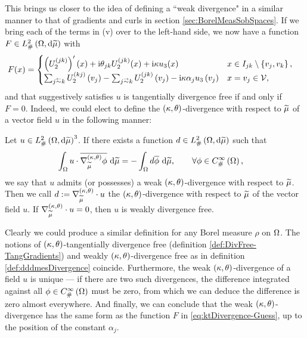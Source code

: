 This brings us closer to the idea of defining a ``weak divergence" in a similar manner to that of gradients and curls in section \ref{sec:BorelMeasSobSpaces}.
If we bring each of the terms in (v) over to the left-hand side, we now have a function $F\in L^2_{\#}\left( \Omega,\mathrm{d} \widetilde{\mu} \right)$ with
\begin{align} \label{eq:ktDivergence-Guess}
	F(x) &= 
	\begin{cases} 
		\bracs{U_2^{(jk)}}'(x) + \rmi\qm_{jk}U_2^{(jk)}(x) + \rmi\wavenumber u_3(x) &
		x\in I_{jk}\setminus\clbracs{v_j,v_k}, \\
		\sum_{j\conRight k}U_2^{(kj)}\bracs{v_j} - \sum_{j\conLeft k}U_2^{(jk)}\bracs{v_j} -\rmi\wavenumber\alpha_j u_3\bracs{v_j} &
		x=v_j\in\vertSet,
	\end{cases}
\end{align}
and that suggestively satisfies $u$ is tangentially divergence free if and only if $F=0$.
Indeed, we could elect to define the $\left( \kappa, \theta \right)$-divergence with respect to $\widetilde{\mu}$ of a vector field $u$ in the following manner:
\begin{definition} \label{def:dddmesDivergence}
	Let $u\in L^2_{\#}\left( \Omega,\mathrm{d} \widetilde{\mu} \right)^3$.
	If there exists a function $d\in L^2_{\#}\left( \Omega,\mathrm{d} \widetilde{\mu} \right)$ such that
	\begin{align*}
		\int_{\Omega} u\cdot\overline{\nabla^{\left( \kappa, \theta \right)}_{\widetilde{\mu}}\phi}  \ \mathrm{d}\widetilde{\mu}
		&= -\int_{\Omega} d\overline{\phi}  \ \mathrm{d}\widetilde{\mu}, \qquad\forall\phi\in C^{\infty}_{\#}\left( \Omega \right),
	\end{align*}
	we say that $u$ admits (or possesses) a weak $\left( \kappa, \theta \right)$-divergence with respect to $\widetilde{\mu}$.
	Then we call $d:=\nabla^{\left( \kappa, \theta \right)}_{\widetilde{\mu}}\cdot u$ the $\left( \kappa, \theta \right)$-divergence with respect to $\widetilde{\mu}$ of the vector field $u$.
	If $\nabla^{\left( \kappa, \theta \right)}_{\widetilde{\mu}}\cdot u=0$, then $u$ is weakly divergence free.
\end{definition}
Clearly we could produce a similar definition for any Borel measure $\rho$ on $\Omega$.
The notions of $\left( \kappa, \theta \right)$-tangentially divergence free (definition \ref{def:DivFree-TangGradients}) and weakly $\left( \kappa, \theta \right)$-divergence free as in definition \ref{def:dddmesDivergence} coincide.
Furthermore, the weak $\left( \kappa, \theta \right)$-divergence of a field $u$ is unique --- if there are two such divergences, the difference integrated against all $\phi\in C^{\infty}_{\#}\left( \Omega \right)$ must be zero, from which we can deduce the difference is zero almost everywhere.
And finally, we can conclude that the weak $\left( \kappa, \theta \right)$-divergence has the same form as the function $F$ in \eqref{eq:ktDivergence-Guess}, up to the position of the constant $\alpha_j$.
